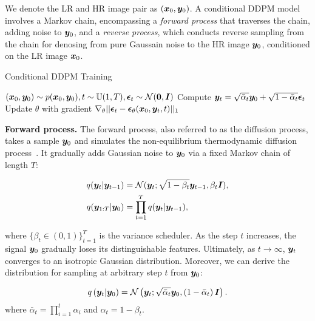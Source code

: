 We denote the LR and HR image pair as $({\bm{x}}_0, {\bm{y}}_0)$. A conditional DDPM model involves a Markov chain, encompassing a \emph{forward process} that traverses the chain, adding noise to ${\bm{y}}_0$, and a \emph{reverse process}, which conducts reverse sampling from the chain for denosing from pure Gaussain noise to the HR image ${\bm{y}}_0$, conditioned on the LR image ${\bm{x}}_0$.

\begin{algorithm}[t]
\small
\caption{Conditional DDPM Training}
\begin{algorithmic}[1]
    \REPEAT
    \STATE $({\bm{x}}_0, {\bm{y}}_0)\sim p({\bm{x}}_0, {\bm{y}}_0), t\sim{\mathbb{U}}(1,T), \bm{{\mathbf{\epsilon}}}_t\sim{\mathcal{N}}({\bm{0}}, {\bm{I}})$
    \STATE Compute ${\bm{y}}_t = \sqrt{\bar{\alpha}_t}{\bm{y}}_0 + \sqrt{1-\bar{\alpha}_t}\bm{{\mathbf{\epsilon}}}_t$ \label{line:update-yt-training}
    \STATE
    Update $\theta$ with gradient $\nabla_{\mathbf{\theta}}||\bm{{\mathbf{\epsilon}}}_t-\bm{{\mathbf{\epsilon}}}_{\mathbf{\theta}}({\bm{x}}_0,{\bm{y}}_t, t)||_1$
\end{algorithmic}
\label{sr3-training}
\end{algorithm}


\textbf{Forward process.} The forward process, also referred to as the diffusion process, takes a sample ${\bm{y}}_0$ and simulates the non-equilibrium thermodynamic diffusion process~\cite{sohl2015deep}. It gradually adds Gaussian noise to ${\bm{y}}_0$ via a fixed Markov chain of length $T$:

\vspace{-.25in}
\begin{align}
\small
q({\bm{y}}_t|{\bm{y}}_{t-1}) &= {\mathcal{N}}({\bm{y}}_t; \sqrt{1-\beta_t}{\bm{y}}_{t-1}, \beta_t {\bm{I}}),\\
q({\bm{y}}_{1:T}| {\bm{y}}_0) &=\prod_{t=1}^Tq({\bm{y}}_t|{\bm{y}}_{t-1}),
\end{align}
\vspace{-.15in}

\noindent
where $\{\beta_t\in (0,1)\}_{t=1}^T$ is the variance scheduler. As the step $t$ increases, the signal ${\bm{y}}_0$ gradually loses its distinguishable features. Ultimately, as $t\to\infty$, ${\bm{y}}_t$ converges to an isotropic Gaussian distribution. Moreover, we can derive the distribution for sampling at arbitrary step $t$ from ${\bm{y}}_0$:

\vspace{-.2in}
\begin{align}
\small
    q\left({\bm{y}}_t | {\bm{y}}_0\right)=\mathcal{N}\left({\bm{y}}_t ; \sqrt{\bar{\alpha}_t} {\bm{y}}_0,\left(1-\bar{\alpha}_t\right) \boldsymbol{I}\right) .
    \label{eq:forward-yt}
\end{align}
where $\bar{\alpha}_t=\prod_{i=1}^t\alpha_i$ and $\alpha_t=1-\beta_t$.


